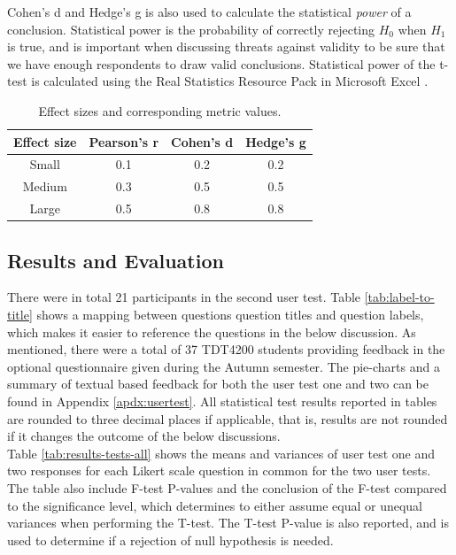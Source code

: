 Cohen's d and Hedge's g is also used to calculate the statistical \textit{power} of a conclusion. Statistical power is the probability of correctly rejecting $H_0$ when $H_1$ is true, and is important when discussing threats against validity to be sure that we have enough respondents to draw valid conclusions. Statistical power of the t-test is calculated using the Real Statistics Resource Pack in Microsoft Excel \cite{RSRP}.

\begin{table}[t!]
    \centering
    \begin{tabular}{ | c | c | c | c |}
    \hline
    \textbf{Effect size} & \textbf{Pearson's r} & \textbf{Cohen's d} & \textbf{Hedge's g} \\ \hline
    Small & 0.1 & 0.2 & 0.2 \\ \hline
    Medium & 0.3 & 0.5 & 0.5 \\ \hline
    Large & 0.5 & 0.8 & 0.8 \\ \hline
    \end{tabular}
    \caption{Effect sizes and corresponding metric values.}
    \label{tab:effect-size}
\end{table}

\subsection{Results and Evaluation}
\label{sub-sec:user-testing-results}
There were in total 21 participants in the second user test. Table \ref{tab:label-to-title} shows a mapping between questions question titles and question labels, which makes it easier to reference the questions in the below discussion. As mentioned, there were a total of 37 TDT4200 students providing feedback in the optional questionnaire given during the Autumn semester. The pie-charts and a summary of textual based feedback for both the user test one and two can be found in Appendix \ref{apdx:usertest}. All statistical test results reported in tables are rounded to three decimal places if applicable, that is, results are not rounded if it changes the outcome of the below discussions. \\

Table \ref{tab:results-tests-all} shows the means and variances of user test one and two responses for each Likert scale question in common for the two user tests. The table also include F-test P-values and the conclusion of the F-test compared to the significance level, which determines to either assume equal or unequal variances when performing the T-test. The T-test P-value is also reported, and is used to determine if a rejection of null hypothesis is needed. \\

